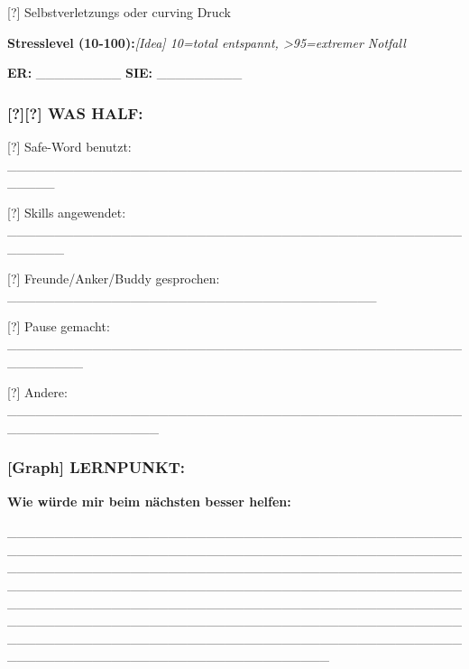 [?] Selbstverletzungs oder curving Druck

\textbf{Stresslevel (10-100):}\emph{[Idea] 10=total entspannt, \textgreater95=extremer Notfall}

\textbf{ER:} \_\_\_\_\_\_\_\_\_ \textbf{SIE:} \_\_\_\_\_\_\_\_\_

\hypertarget{section-4}{%
\subsubsection{}\label{section-4}}

\hypertarget{was-half}{%
\subsubsection{\texorpdfstring{\textbf{[?][?] WAS HALF:}}{[?][?] WAS HALF:}}\label{was-half}}

[?] Safe-Word benutzt: \_\_\_\_\_\_\_\_\_\_\_\_\_\_\_\_\_\_\_\_\_\_\_\_\_\_\_\_\_\_\_\_\_\_\_\_\_\_\_\_\_\_\_\_\_\_\_\_\_\_\_\_\_

[?] Skills angewendet: \_\_\_\_\_\_\_\_\_\_\_\_\_\_\_\_\_\_\_\_\_\_\_\_\_\_\_\_\_\_\_\_\_\_\_\_\_\_\_\_\_\_\_\_\_\_\_\_\_\_\_\_\_\_

[?] Freunde/Anker/Buddy gesprochen: \_\_\_\_\_\_\_\_\_\_\_\_\_\_\_\_\_\_\_\_\_\_\_\_\_\_\_\_\_\_\_\_\_\_\_\_\_\_\_

[?] Pause gemacht: \_\_\_\_\_\_\_\_\_\_\_\_\_\_\_\_\_\_\_\_\_\_\_\_\_\_\_\_\_\_\_\_\_\_\_\_\_\_\_\_\_\_\_\_\_\_\_\_\_\_\_\_\_\_\_\_

[?] Andere: \_\_\_\_\_\_\_\_\_\_\_\_\_\_\_\_\_\_\_\_\_\_\_\_\_\_\_\_\_\_\_\_\_\_\_\_\_\_\_\_\_\_\_\_\_\_\_\_\_\_\_\_\_\_\_\_\_\_\_\_\_\_\_\_

\hypertarget{section-5}{%
\subsubsection{}\label{section-5}}

\hypertarget{lernpunkt}{%
\subsubsection{\texorpdfstring{\textbf{[Graph] LERNPUNKT:}}{[Graph] LERNPUNKT:}}\label{lernpunkt}}

\textbf{Wie würde mir beim nächsten besser helfen:}

\_\_\_\_\_\_\_\_\_\_\_\_\_\_\_\_\_\_\_\_\_\_\_\_\_\_\_\_\_\_\_\_\_\_\_\_\_\_\_\_\_\_\_\_\_\_\_\_\_\_\_\_\_\_\_\_\_\_\_\_\_\_\_\_\_\_\_\_\_\_\_\_\_\_\_\_\_\_\_\_\_\_\_\_\_\_\_\_\_\_\_\_\_\_\_\_\_\_\_\_\_\_\_\_\_\_\_\_\_\_\_\_\_\_\_\_\_\_\_\_\_\_\_\_\_\_\_\_\_\_\_\_\_\_\_\_\_\_\_\_\_\_\_\_\_\_\_\_\_\_\_\_\_\_\_\_\_\_\_\_\_\_\_\_\_\_\_\_\_\_\_\_\_\_\_\_\_\_\_\_\_\_\_\_\_\_\_\_\_\_\_\_\_\_\_\_\_\_\_\_\_\_\_\_\_\_\_\_\_\_\_\_\_\_\_\_\_\_\_\_\_\_\_\_\_\_\_\_\_\_\_\_\_\_\_\_\_\_\_\_\_\_\_\_\_\_\_\_\_\_\_\_\_\_\_\_\_\_\_\_\_\_\_\_\_\_\_\_\_\_\_\_\_\_\_\_\_\_\_\_\_\_\_\_\_\_\_\_\_\_\_\_\_\_\_\_\_\_\_\_\_\_\_\_\_\_\_\_\_\_\_\_\_\_\_\_\_\_\_\_\_\_\_\_\_\_\_\_\_\_\_\_\_\_\_\_\_\_\_\_\_\_\_\_\_\_\_\_\_\_\_\_\_\_\_\_\_\_\_\_\_\_\_\_\_\_\_\_\_\_

